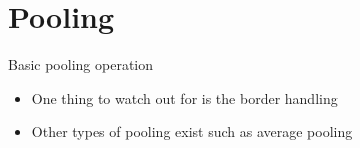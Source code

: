 \documentclass[utf8x,hyperref={pdfpagelabels=false}]{beamer}
\begin{document}
\section{Pooling}

\begin{frame}
Basic pooling operation 
\begin{overlayarea}{\textwidth}{5cm}
\end{overlayarea}
\end{frame}

\begin{frame}
\begin{itemize}
\item One thing to watch out for is the border handling
\item Other types of pooling exist such as average pooling
\end{itemize}
\end{frame}
\end{document}
